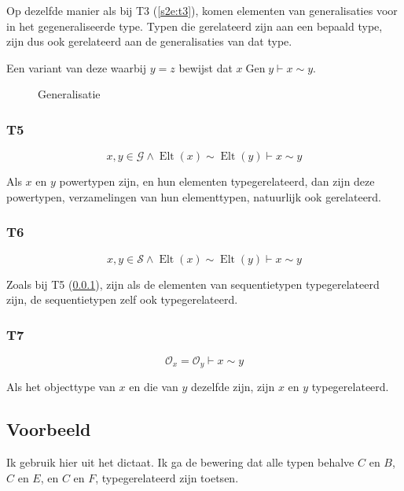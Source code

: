 \documentclass[11pt]{article}
\newcommand{\Gen}{\ensuremath{\operatorname{Gen}}}
\begin{document}
Op dezelfde manier als bij T3 (\ref{s2e:t3}), komen elementen van
generalisaties voor in het gegeneraliseerde type. Typen die gerelateerd zijn aan 
een bepaald type, zijn dus ook gerelateerd aan de generalisaties
van dat type.

Een variant van deze waarbij $y=z$ bewijst dat $x \Gen y \vdash x \sim y$.


\begin{figure}[b]
  \centering
  \caption{Generalisatie}
  \label{fig:generalisatie}
\end{figure}

\subsubsection{T5}
\label{T5}
\[
  x,y \in \mathcal{G} \wedge \operatorname{Elt}(x) \sim 
  \operatorname{Elt}(y) \vdash x \sim y
\]

Als $x$ en $y$ powertypen zijn, en hun elementen typegerelateerd, 
dan zijn deze powertypen, verzamelingen van hun elementtypen,
natuurlijk ook gerelateerd.

\subsubsection{T6}
\[
  x,y \in \mathcal{S} \wedge \operatorname{Elt}(x) \sim 
  \operatorname{Elt}(y) \vdash x \sim y
\]

Zoals bij T5 (\ref{T5}), zijn als de elementen van sequentietypen 
typegerelateerd zijn, de sequentietypen zelf ook typegerelateerd.

\subsubsection{T7}
\[
  \mathcal{O}_x = \mathcal{O}_y \vdash x \sim y
\]

Als het objecttype van $x$ en die van $y$ dezelfde zijn, zijn $x$ en $y$ 
typegerelateerd.

\clearpage

\subsection{Voorbeeld}

Ik gebruik hier \cite[figuur 2.26]{dictaat} uit het dictaat. Ik ga de bewering 
dat alle typen behalve $C$ en $B$, $C$ en $E$, en $C$ en $F$, typegerelateerd
zijn toetsen.
\end{document}
